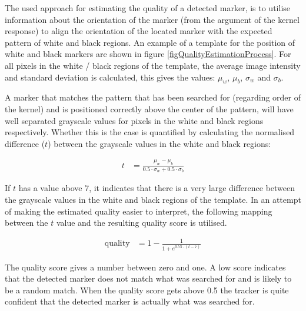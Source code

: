 \documentclass{article}
\begin{document}
The used approach for estimating the quality of a detected marker, is to utilise
information about the orientation of the marker (from the argument of the kernel response)
to align the orientation of the located marker with the expected pattern of white and black regions.
An example of a template for the position of white and black markers are shown in
figure \ref{figQualityEstimationProcess}.
For all pixels in the white / black regions of the template, the average image intensity and
standard deviation is calculated, this gives the values: $\mu_w$, $\mu_b$, $\sigma_w$ and $\sigma_b$.

A marker that matches the pattern that has been searched for (regarding order of the kernel)
and is positioned correctly above the center of the pattern, will have well separated grayscale values for pixels in the
white and black regions respectively.
Whether this is the case is quantified by calculating the normalised difference ($t$) between
the grayscale values in the white and black regions:

\begin{align}
t &= \frac{\mu_w - \mu_b}{0.5 \cdot \sigma_w + 0.5 \cdot \sigma_b}
\end{align}

If $t$ has a value above 7, it indicates that there is a very large difference between the grayscale
values in the white and black regions of the template.
In an attempt of making the estimated quality easier to interpret, the following
mapping between the $t$ value and the resulting quality score is utilised.

\begin{align}
\text{quality} &= 1 - \frac{1}{1 + e^{0.75 \cdot (t - 7)}}
\end{align}

The quality score gives a number between zero and one.
A low score indicates that the detected marker does not match what was searched for and is likely to be a random match.
When the quality score gets above 0.5 the tracker is quite confident that the detected marker is actually what was searched for.
\end{document}
